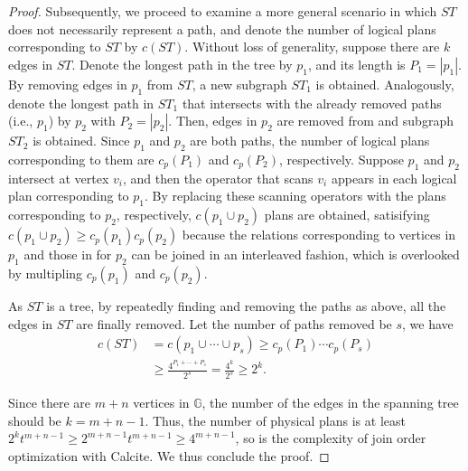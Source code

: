 \begin{proof}
    Subsequently, we proceed to examine a more general scenario in which $ST$ does not necessarily represent a path, and denote the number of logical plans corresponding to $ST$ by $c(ST)$.
    Without loss of generality, suppose there are $k$ edges in $ST$.
    Denote the longest path in the tree by $p_1$, and its length is $P_1 = |p_1|$.
    By removing edges in $p_1$ from $ST$, a new subgraph $ST_1$ is obtained.
    Analogously, denote the longest path in $ST_1$ that intersects with the already removed paths (i.e., $p_1$) by $p_2$ with $P_2 = |p_2|$.
    Then, edges in $p_2$ are removed from and subgraph $ST_2$ is obtained.
    Since $p_1$ and $p_2$ are both paths, the number of logical plans corresponding to them are $c_p(P_1)$ and $c_p(P_2)$, respectively.
    Suppose $p_1$ and $p_2$ intersect at vertex $v_i$, and then the operator that scans $v_i$ appears in each logical plan corresponding to $p_1$.
    By replacing these scanning operators with the plans corresponding to $p_2$, respectively, $c(p_1 \cup p_2)$ plans are obtained, satisifying $c(p_1 \cup p_2) \geq c_p(p_1)c_p(p_2)$ because the relations corresponding to vertices in $p_1$ and those in for $p_2$ can be joined in an interleaved fashion, which is overlooked by multipling $c_p(p_1)$ and $c_p(p_2)$.

    As $ST$ is a tree, by repeatedly finding and removing the paths as above, all the edges in $ST$ are finally removed.
    Let the number of paths removed be $s$, we have
    \begin{equation*}
        \begin{split}
            c(ST) & = c(p_1 \cup \cdots \cup p_s) \geq c_p(P_1) \cdots c_p(P_s) \\
            & \geq \frac{4^{P_1 + \cdots + P_s}}{2^s} = \frac{4^{k}}{2^s} \geq 2^{k}.
        \end{split}
    \end{equation*}


    Since there are $m + n$ vertices in $\mathbb{G}$, the number of the edges in the spanning tree should be $k = m + n - 1$.
    Thus, the number of physical plans is at least $2^{k}t^{m+n-1} \geq 2^{m+n-1}t^{m+n-1} \geq 4^{m+n-1}$, so is the complexity of join order optimization with Calcite.
    We thus conclude the proof.
\end{proof}


